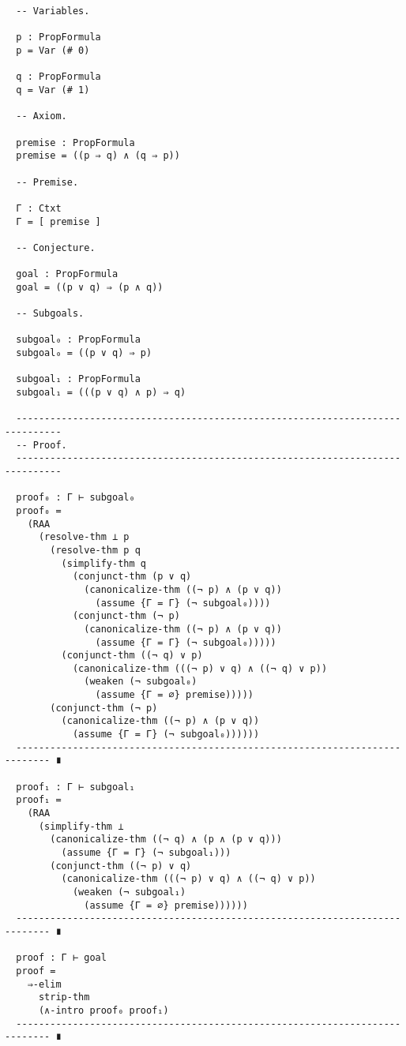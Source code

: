 \documentclass[../main.tex]{subfiles}
\begin{document}
\begin{subappendices}
\begin{verbatim}
  -- Variables.

  p : PropFormula
  p = Var (# 0)

  q : PropFormula
  q = Var (# 1)

  -- Axiom.

  premise : PropFormula
  premise = ((p ⇒ q) ∧ (q ⇒ p))

  -- Premise.

  Γ : Ctxt
  Γ = [ premise ]

  -- Conjecture.

  goal : PropFormula
  goal = ((p ∨ q) ⇒ (p ∧ q))

  -- Subgoals.

  subgoal₀ : PropFormula
  subgoal₀ = ((p ∨ q) ⇒ p)

  subgoal₁ : PropFormula
  subgoal₁ = (((p ∨ q) ∧ p) ⇒ q)

  ------------------------------------------------------------------------------
  -- Proof.
  ------------------------------------------------------------------------------

  proof₀ : Γ ⊢ subgoal₀
  proof₀ =
    (RAA
      (resolve-thm ⊥ p
        (resolve-thm p q
          (simplify-thm q
            (conjunct-thm (p ∨ q)
              (canonicalize-thm ((¬ p) ∧ (p ∨ q))
                (assume {Γ = Γ} (¬ subgoal₀))))
            (conjunct-thm (¬ p)
              (canonicalize-thm ((¬ p) ∧ (p ∨ q))
                (assume {Γ = Γ} (¬ subgoal₀)))))
          (conjunct-thm ((¬ q) ∨ p)
            (canonicalize-thm (((¬ p) ∨ q) ∧ ((¬ q) ∨ p))
              (weaken (¬ subgoal₀)
                (assume {Γ = ∅} premise)))))
        (conjunct-thm (¬ p)
          (canonicalize-thm ((¬ p) ∧ (p ∨ q))
            (assume {Γ = Γ} (¬ subgoal₀))))))
  ---------------------------------------------------------------------------- ∎

  proof₁ : Γ ⊢ subgoal₁
  proof₁ =
    (RAA
      (simplify-thm ⊥
        (canonicalize-thm ((¬ q) ∧ (p ∧ (p ∨ q)))
          (assume {Γ = Γ} (¬ subgoal₁)))
        (conjunct-thm ((¬ p) ∨ q)
          (canonicalize-thm (((¬ p) ∨ q) ∧ ((¬ q) ∨ p))
            (weaken (¬ subgoal₁)
              (assume {Γ = ∅} premise))))))
  ---------------------------------------------------------------------------- ∎

  proof : Γ ⊢ goal
  proof =
    ⇒-elim
      strip-thm
      (∧-intro proof₀ proof₁)
  ---------------------------------------------------------------------------- ∎
\end{verbatim}


\end{subappendices}
\end{document}
